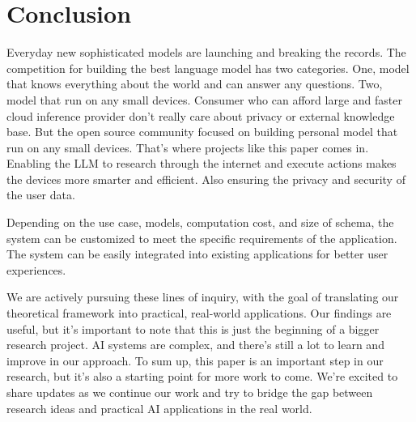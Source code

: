 \documentclass[conference]{IEEEtran}
\begin{document}




\section{Conclusion}
Everyday new sophisticated models are launching and breaking the records. The
competition for building the best language model has two categories. One, model
that knows everything about the world and can answer any questions. Two, model
that run on any small devices. Consumer who can afford large and faster cloud
inference provider don't really care about privacy or external knowledge base.
But the open source community focused on building personal model that run on
any small devices. That's where projects like this paper comes in. Enabling the
LLM to research through the internet and execute actions makes the devices more
smarter and efficient. Also ensuring the privacy and security of the user data.

Depending on the use case, models, computation cost, and size of schema, the
system can be customized to meet the specific requirements of the application.
The system can be easily integrated into existing applications for better user
experiences.

We are actively pursuing these lines of inquiry, with the goal of translating
our theoretical framework into practical, real-world applications. Our findings
are useful, but it's important to note that this is just the beginning of a
bigger research project. AI systems are complex, and there's still a lot to
learn and improve in our approach. To sum up, this paper is an important step
in our research, but it's also a starting point for more work to come. We're
excited to share updates as we continue our work and try to bridge the gap
between research ideas and practical AI applications in the real world.
\end{document}
